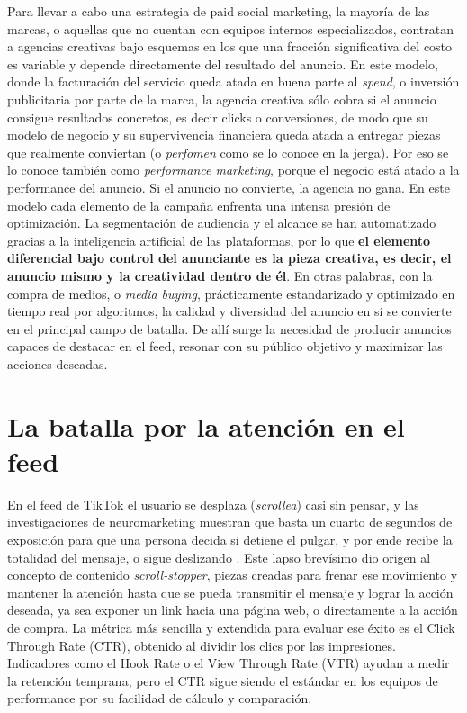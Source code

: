 \documentclass[12pt, a4paper]{report}
\begin{document}
Para llevar a cabo una estrategia de paid social marketing, la mayoría de las
marcas, o aquellas que no cuentan con equipos internos especializados, contratan a
agencias creativas bajo esquemas en los que una fracción significativa del costo es
variable y depende directamente del resultado del anuncio. En este modelo, donde
la facturación del servicio queda atada en buena parte al \textit{spend}, o inversión
publicitaria por parte de la marca, la agencia creativa sólo cobra si el anuncio
consigue resultados concretos, es decir clicks o conversiones, de modo que su modelo de negocio y su
supervivencia financiera queda atada a entregar piezas que realmente conviertan
(o \textit{perfomen} como se lo conoce en la jerga). Por eso se lo conoce también como
\textit{performance marketing}, porque el negocio está atado a la performance del anuncio.
Si el anuncio no convierte, la agencia no gana. En este modelo cada elemento de la campaña 
enfrenta una intensa
presión de optimización. La segmentación de audiencia y el alcance se han
automatizado gracias a la inteligencia artificial de las plataformas, por lo que
\textbf{el elemento diferencial bajo control del anunciante es la pieza creativa, es decir,
el anuncio mismo y la creatividad dentro de él}. En otras palabras, con la compra
de medios, o \textit{media buying}, prácticamente estandarizado y optimizado en tiempo
real por algoritmos, la calidad y diversidad del anuncio en sí se convierte en el
principal campo de batalla. De allí surge la necesidad de producir anuncios capaces
de destacar en el feed, resonar con su público objetivo y maximizar las acciones
deseadas.

\section{La batalla por la atención en el feed}

En el feed de TikTok el usuario se desplaza (\textit{scrollea}) casi sin pensar,
y las investigaciones de neuromarketing muestran que basta un cuarto de segundos de
exposición para que una persona decida si detiene el pulgar, y por ende recibe la totalidad del mensaje, 
o sigue deslizando \citep{metafeed2016}. Este lapso brevísimo dio origen al concepto de contenido
\textit{scroll-stopper}, piezas creadas para frenar ese movimiento y mantener la atención
hasta que se pueda transmitir el mensaje y lograr la acción deseada, ya sea exponer un
link hacia una página web, o directamente a la acción de compra. La métrica más sencilla
y extendida para evaluar ese éxito es el Click Through Rate (CTR), obtenido al dividir los
clics por las impresiones. Indicadores como el Hook Rate o el View Through Rate (VTR)
ayudan a medir la retención temprana, pero el CTR sigue siendo el estándar en los equipos
de performance por su facilidad de cálculo y comparación.
\end{document}
